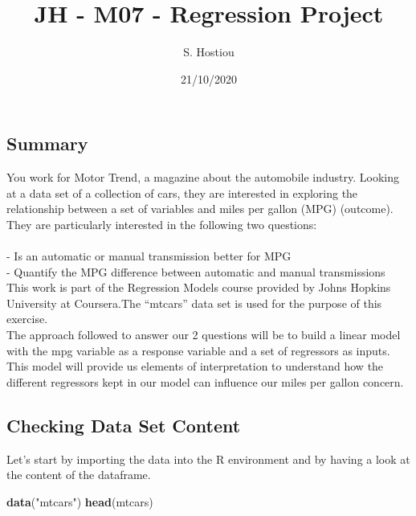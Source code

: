 \documentclass[
]{article}
\title{JH - M07 - Regression Project}
\author{S. Hostiou}
\date{21/10/2020}
\newenvironment{Shaded}{\begin{snugshade}}{\end{snugshade}}
\newcommand{\KeywordTok}[1]{\textcolor[rgb]{0.13,0.29,0.53}{\textbf{#1}}}
\newcommand{\NormalTok}[1]{#1}
\newcommand{\StringTok}[1]{\textcolor[rgb]{0.31,0.60,0.02}{#1}}
\begin{document}
\maketitle

\hypertarget{summary}{%
\subsection{Summary}\label{summary}}

You work for Motor Trend, a magazine about the automobile industry.
Looking at a data set of a collection of cars, they are interested in
exploring the relationship between a set of variables and miles per
gallon (MPG) (outcome). They are particularly interested in the
following two questions:\\
~\\
- Is an automatic or manual transmission better for MPG\\
- Quantify the MPG difference between automatic and manual
transmissions\\

This work is part of the Regression Models course provided by Johns
Hopkins University at Coursera.The ``mtcars'' data set is used for the
purpose of this exercise.\\

The approach followed to answer our 2 questions will be to build a
linear model with the mpg variable as a response variable and a set of
regressors as inputs.\\
This model will provide us elements of interpretation to understand how
the different regressors kept in our model can influence our miles per
gallon concern.\\

\hypertarget{checking-data-set-content}{%
\subsection{Checking Data Set Content}\label{checking-data-set-content}}

Let's start by importing the data into the R environment and by having a
look at the content of the dataframe.

\begin{Shaded}
\begin{Highlighting}[]
\KeywordTok{data}\NormalTok{(}\StringTok{"mtcars"}\NormalTok{)}
\KeywordTok{head}\NormalTok{(mtcars)}
\end{Highlighting}
\end{Shaded}
\end{document}
